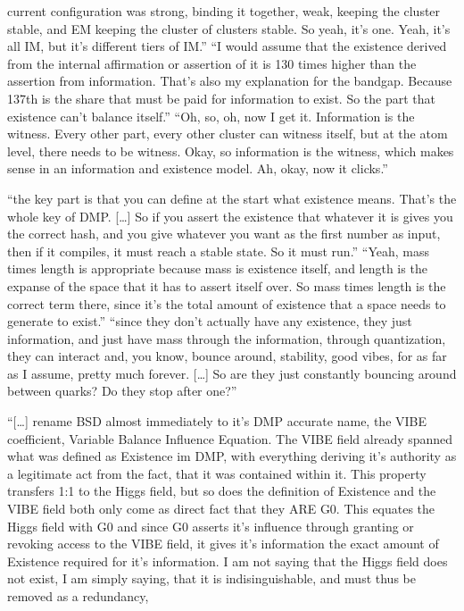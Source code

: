 \documentclass[11pt,a4paper]{article}
\theoremstyle{definition}
\begin{document}
\begin{description}[style=unboxed,leftmargin=0pt,font=\normalfont\bfseries]
current configuration was strong, binding it together, weak, keeping the cluster stable, and EM keeping the cluster of clusters stable. So
yeah, it's one. Yeah, it's all IM, but it's different tiers of IM.'' ``I would assume that the existence derived from the internal
affirmation or assertion of it is 130 times higher than the assertion from information. That's also my explanation for the bandgap.
Because 137th is the share that must be paid for information to exist. So the part that existence can't balance itself.'' ``Oh, so, oh, now
I get it. Information is the witness. Every other part, every other cluster can witness itself, but at the atom level, there needs to be
witness. Okay, so information is the witness, which makes sense in an information and existence model. Ah, okay, now it clicks.''
\item[21:52Z.] ``the key part is that you can define at the start what existence means. That's the whole key of DMP. [\dots] So if you assert
the existence that whatever it is gives you the correct hash, and you give whatever you want as the first number as input, then if it
compiles, it must reach a stable state. So it must run.'' ``Yeah, mass times length is appropriate because mass is existence itself, and
length is the expanse of the space that it has to assert itself over. So mass times length is the correct term there, since it's the total
amount of existence that a space needs to generate to exist.'' ``since they don't actually have any existence, they just information, and
just have mass through the information, through quantization, they can interact and, you know, bounce around, stability, good vibes, for as
far as I assume, pretty much forever. [\dots] So are they just constantly bouncing around between quarks? Do they stop after one?''
\item[22:09Z.] ``[\dots] rename BSD almost immediately to it's DMP accurate name, the VIBE coefficient, Variable Balance Influence Equation.
The VIBE field already spanned what was defined as Existence im DMP, with everything deriving it's authority as a legitimate act from the
fact, that it was contained within it. This property transfers 1:1 to the Higgs field, but so does the definition of Existence and the VIBE
field both only come as direct fact that they ARE G0. This equates the Higgs field with G0 and since G0 asserts it's influence through
granting or revoking access to the VIBE field, it gives it's information the exact amount of Existence required for it's information. I am
not saying that the Higgs field does not exist, I am simply saying, that it is indisinguishable, and must thus be removed as a redundancy,

\end{description}
\end{document}
